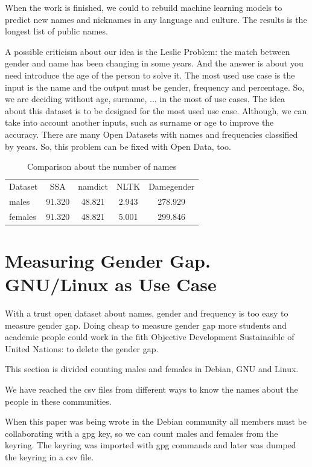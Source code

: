 \documentclass[a4paper]{article}
\begin{document}
When the work is finished, we could to rebuild machine learning models
to predict new names and nicknames in any language and culture. The
results is the longest list of public names.

A possible criticism about our idea is the Leslie
Problem\cite{blevins2015jane}: the match between gender and name has
been changing in some years. And the answer is about you need
introduce the age of the person to solve it. The most used use case is
the input is the name and the output must be gender, frequency and
percentage. So, we are deciding without age, surname, ... in the most
of use cases. The idea about this dataset is to be designed for the
most used use case. Although, we can take into account another inputs,
such as surname or age to improve the accuracy. There are many Open
Datasets with names and frequencies classified by years. So, this
problem can be fixed with Open Data, too.

\begin{table}[t]
\footnotesize
\begin{tabular}[]{lcccc}
  \hline
  Dataset & SSA & namdict & NLTK & Damegender \tabularnewline
  males & 91.320 & 48.821 & 2.943 & 278.929 \tabularnewline
  females & 91.320 & 48.821 & 5.001 & 299.846 \tabularnewline
  \hline
\end{tabular}
\caption{Comparison about the number of names}
\label{table:DifferentNamesMeasures}
\end{table}


\section{Measuring Gender Gap. GNU/Linux as Use Case}
\label{sec:measuring}

With a trust open dataset about names, gender and frequency is too
easy to measure gender gap. Doing cheap to measure gender gap more
students and academic people could work in the fith Objective
Development Sustainaible of United Nations: to delete the gender gap.

This section is divided counting males and females in Debian, GNU and
Linux.

We have reached the csv files from different ways to know the names
about the people in these communities.

When this paper was being wrote in the Debian community all members
must be collaborating with a gpg key, so we can count males and females
from the keyring. The keyring was imported with gpg commands and later
was dumped the keyring in a csv file.
\end{document}
